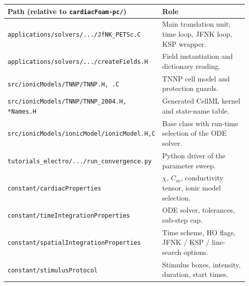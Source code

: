 \documentclass[11pt,a4paper]{article}
\newcommand{\code}[1]{\texttt{\small #1}}
\begin{document}
\begin{center}
\begin{tabular}{@{}p{0.55\linewidth}p{0.40\linewidth}@{}}
\toprule
Path (relative to \code{cardiacFoam-pc/}) & Role \\
\midrule
\code{applications/solvers/.../JfNK\_PETSc.C} & Main translation unit; time loop, JFNK loop, KSP wrapper. \\
\code{applications/solvers/.../createFields.H} & Field instantiation and dictionary reading. \\
\code{src/ionicModels/TNNP/TNNP.H, .C} & TNNP cell model and protection guards. \\
\code{src/ionicModels/TNNP/TNNP\_2004.H, *Names.H} & Generated CellML kernel and state-name table. \\
\code{src/ionicModels/ionicModel/ionicModel.{H,C}} & Base class with run-time selection of the ODE solver. \\
\code{tutorials\_electro/.../run\_convergence.py} & Python driver of the parameter sweep. \\
\code{constant/cardiacProperties} & $\chi$, $C_{m}$, conductivity tensor, ionic model selection. \\
\code{constant/timeIntegrationProperties} & ODE solver, tolerances, sub-step cap. \\
\code{constant/spatialIntegrationProperties} & Time scheme, HO flags, JFNK / KSP / line-search options. \\
\code{constant/stimulusProtocol} & Stimulus boxes, intensity, duration, start times. \\
\bottomrule
\end{tabular}
\end{center}
\end{document}
